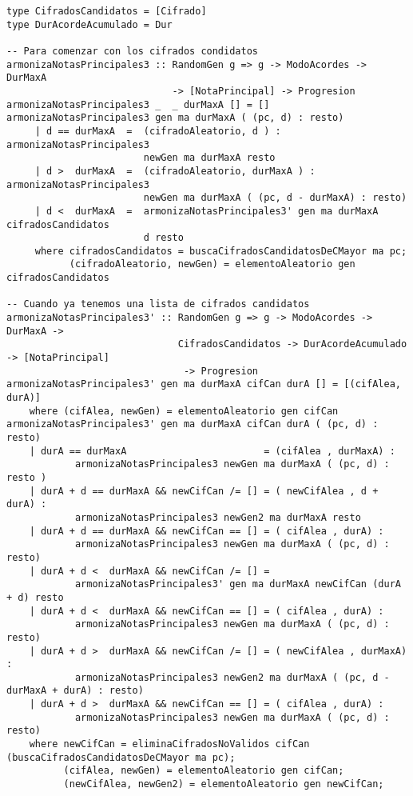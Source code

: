 \small
\begin{verbatim}
type CifradosCandidatos = [Cifrado]
type DurAcordeAcumulado = Dur

-- Para comenzar con los cifrados condidatos
armonizaNotasPrincipales3 :: RandomGen g => g -> ModoAcordes -> DurMaxA 
                             -> [NotaPrincipal] -> Progresion
armonizaNotasPrincipales3 _  _ durMaxA [] = []
armonizaNotasPrincipales3 gen ma durMaxA ( (pc, d) : resto)
     | d == durMaxA  =  (cifradoAleatorio, d ) : armonizaNotasPrincipales3 
                        newGen ma durMaxA resto   
     | d >  durMaxA  =  (cifradoAleatorio, durMaxA ) : armonizaNotasPrincipales3 
                        newGen ma durMaxA ( (pc, d - durMaxA) : resto)
     | d <  durMaxA  =  armonizaNotasPrincipales3' gen ma durMaxA cifradosCandidatos 
                        d resto  
     where cifradosCandidatos = buscaCifradosCandidatosDeCMayor ma pc;
           (cifradoAleatorio, newGen) = elementoAleatorio gen cifradosCandidatos 

-- Cuando ya tenemos una lista de cifrados candidatos
armonizaNotasPrincipales3' :: RandomGen g => g -> ModoAcordes -> DurMaxA -> 
                              CifradosCandidatos -> DurAcordeAcumulado -> [NotaPrincipal] 
                               -> Progresion
armonizaNotasPrincipales3' gen ma durMaxA cifCan durA [] = [(cifAlea, durA)]
    where (cifAlea, newGen) = elementoAleatorio gen cifCan 
armonizaNotasPrincipales3' gen ma durMaxA cifCan durA ( (pc, d) : resto) 
    | durA == durMaxA                        = (cifAlea , durMaxA) : 
            armonizaNotasPrincipales3 newGen ma durMaxA ( (pc, d) : resto )
    | durA + d == durMaxA && newCifCan /= [] = ( newCifAlea , d + durA) : 
            armonizaNotasPrincipales3 newGen2 ma durMaxA resto        
    | durA + d == durMaxA && newCifCan == [] = ( cifAlea , durA) : 
            armonizaNotasPrincipales3 newGen ma durMaxA ( (pc, d) : resto)   
    | durA + d <  durMaxA && newCifCan /= [] = 
            armonizaNotasPrincipales3' gen ma durMaxA newCifCan (durA + d) resto                 
    | durA + d <  durMaxA && newCifCan == [] = ( cifAlea , durA) : 
            armonizaNotasPrincipales3 newGen ma durMaxA ( (pc, d) : resto)   
    | durA + d >  durMaxA && newCifCan /= [] = ( newCifAlea , durMaxA) : 
            armonizaNotasPrincipales3 newGen2 ma durMaxA ( (pc, d - durMaxA + durA) : resto)
    | durA + d >  durMaxA && newCifCan == [] = ( cifAlea , durA) : 
            armonizaNotasPrincipales3 newGen ma durMaxA ( (pc, d) : resto)   
    where newCifCan = eliminaCifradosNoValidos cifCan (buscaCifradosCandidatosDeCMayor ma pc);
          (cifAlea, newGen) = elementoAleatorio gen cifCan;
          (newCifAlea, newGen2) = elementoAleatorio gen newCifCan;
\end{verbatim}

